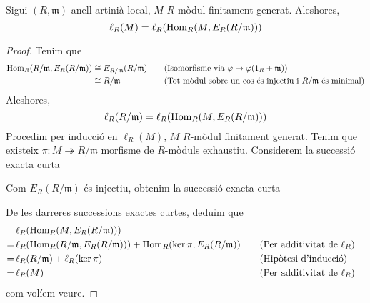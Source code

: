 \begin{lema}\label{artinian-local-lenght}
    Sigui $(R,\mathfrak{m})$ anell artinià local, $M$ $R$-mòdul finitament generat. Aleshores,
    \begin{equation*}
        \ell_{R}(M)=\ell_{R}(\operatorname{Hom}_{R}(M,E_{R}(R/\mathfrak{m})))
    \end{equation*}
    \begin{proof}
        Tenim que
        \begin{align*}
            \operatorname{Hom}_{R}(R/\mathfrak{m},E_{R}(R/\mathfrak{m}))
            &\cong E_{R/\mathfrak{m}}(R/\mathfrak{m})
            &\quad&\textrm{(Isomorfisme via $\varphi\mapsto\varphi(1_{R}+\mathfrak{m})$)}\\
            &\cong R/\mathfrak{m}
            &\quad&\textrm{(Tot mòdul sobre un cos és injectiu i $R/\mathfrak{m}$ és minimal)}
        \end{align*}
        Aleshores, 
        \begin{equation*}
            \ell_{R}(R/\mathfrak{m})=\ell_{R}(\operatorname{Hom}_{R}(M,E_{R}(R/\mathfrak{m})))
        \end{equation*}
        Procedim per inducció en $\ell_{R}(M)$, $M$ $R$-mòdul finitament generat. Tenim que existeix $\pi:M\twoheadrightarrow R/\mathfrak{m}$ morfisme de $R$-mòduls exhaustiu. Considerem la successió exacta curta
        \begin{center}
        \end{center}
        Com $E_{R}(R/\mathfrak{m})$ és injectiu, obtenim la successió exacta curta
        \begin{center}
        \end{center}
        De les darreres successions exactes curtes, deduïm que
        \begin{align*}
            &\ell_{R}(\operatorname{Hom}_{R}(M,E_{R}(R/\mathfrak{m})))\\
            =\,
            &\ell_{R}(\operatorname{Hom}_{R}(R/\mathfrak{m},E_{R}(R/\mathfrak{m})))
            +\operatorname{Hom}_{R}(\ker{\pi},E_{R}(R/\mathfrak{m}))
            &\quad&\textrm{(Per additivitat de $\ell_{R}$)}\\
            =\,
            &\ell_{R}(R/\mathfrak{m})
            +\ell_{R}(\ker{\pi})
            &\quad&\textrm{(Hipòtesi d'inducció)}\\
            =\,
            &\ell_{R}(M)
            &\quad&\textrm{(Per additivitat de $\ell_{R}$)}
        \end{align*}
        com volíem veure.
    \end{proof}
\end{lema}
